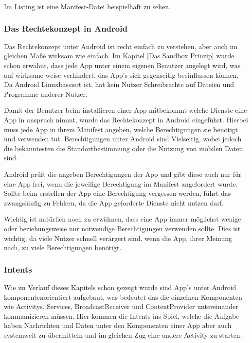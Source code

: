 Im Listing ist eine Manifest-Datei beispielhaft zu sehen.



\subsubsection{Das Rechtekonzept in Android}
Das Rechtekonzept unter Android ist recht einfach zu verstehen, aber auch im gleichen Ma\ss{}e wirksam wie einfach. Im Kapitel \ref{Das Sandbox Prinzip} wurde schon erw\"ahnt, dass jede App unter einem eigenen Benutzer angelegt wird, was auf wirksame weise verhindert, das App's sich gegenseitig beeinflussen k\"onnen. Da Android Linuxbassiert ist, hat kein Nutzer Schreibrechte auf Dateien und Programme anderer Nutzer.

Damit der Benutzer beim installieren einer App mitbekommt welche Dienste eine App in anspruch nimmt, wurde das Rechtekonzept in Android eingef\"uhrt. Hierbei muss jede App in ihrem Manifest angeben, welche Berechtigungen sie ben\"otigt und verwenden tut. Berechtigungen unter Android sind Vielseitig, wobei jedoch die bekanntesten die Standortbestimmung oder die Nutzung von mobilen Daten sind. \cite{BerechtigungenPIT}

Android pr\"uft die angeben Berechtigungen der App und gibt diese auch nur f\"ur eine App frei, wenn die jeweilige Berechtigung im Manifest angefordert wurde. Sollte beim erstellen der App eine Berechtigung vergessen werden, f\"uhrt das zwangsl\"aufig zu Fehlern, da die App geforderte Dienste nicht nutzen darf.

Wichtig ist nat\"urlich noch zu erw\"ahnen, dass eine App immer m\"oglichst wenige oder beziehungsweise nur notwendige Berechtigungen verwenden sollte. Dies ist wichtig, da viele Nutzer schnell ver\"argert sind, wenn die App, ihrer Meinung nach, zu viele Berechtigungen ben\"otigt. \cite{BerechtigungenPIT}

\subsubsection{Intents} \label{Intents}
Wie im Verlauf dieses Kapitels schon gezeigt wurde sind App's unter Android komponentenorientiert aufgebaut, was bedeutet das die einzelnen Komponenten wie Activitys, Services, BroadcastReceiver und ContentProvider untereinander kommunizieren m\"ussen. Hier kommen die Intents ins Spiel, welche die Aufgabe haben Nachrichten und Daten unter den Komponenten einer App aber auch systemweit zu \"ubermitteln und im gleichen Zug eine andere Activity zu starten.

